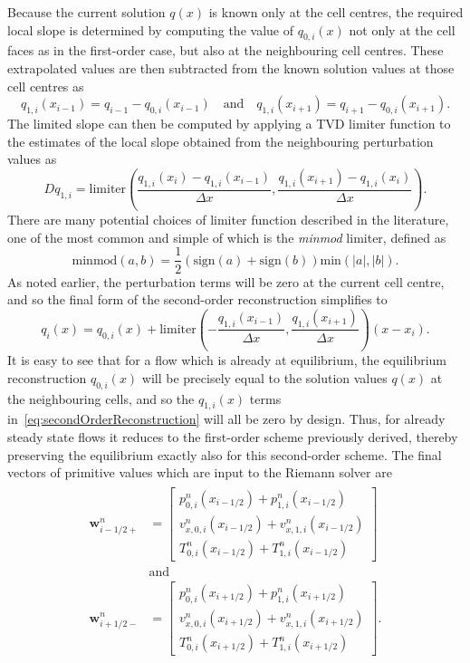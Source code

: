 Because the current solution $q(x)$ is known only at the cell centres, the required local slope is determined by computing the value of $q_{0,i}(x)$ not only at the cell faces as in the first-order case, but also at the neighbouring cell centres. These extrapolated values are then subtracted from the known solution values at those cell centres as
\begin{equation}
q_{1,i}(x_{i-1})=q_{i-1}-q_{0,i}(x_{i-1})\quad \textrm{and}\quad q_{1,i}(x_{i+1})=q_{i+1}-q_{0,i}(x_{i+1}).
\end{equation}
The limited slope can then be computed by applying a TVD limiter function to the estimates of the local slope obtained from the neighbouring perturbation values as
\begin{equation}
Dq_{1,i}=\textrm{limiter}\left(\frac{q_{1,i}(x_i)-q_{1,i}(x_{i-1})}{\Delta x},\frac{q_{1,i}(x_{i+1})-q_{1,i}(x_i)}{\Delta x}\right).
\end{equation}
There are many potential choices of limiter function described in the literature, one of the most common and simple of which is the \emph{minmod} limiter, defined as
\begin{equation} \label{eq:minmod}
\textrm{minmod}(a,b)=\frac{1}{2}\left(\textrm{sign}(a)+\textrm{sign}(b)\right)\textrm{min}\left(|a|,|b|\right).
\end{equation}
As noted earlier, the perturbation terms will be zero at the current cell centre, and so the final form of the second-order reconstruction simplifies to
\begin{equation} \label{eq:secondOrderReconstruction}
q_i(x)=q_{0,i}(x)+\textrm{limiter}\left(-\frac{q_{1,i}(x_{i-1})}{\Delta x},\frac{q_{1,i}(x_{i+1})}{\Delta x}\right)(x-x_i).
\end{equation}
It is easy to see that for a flow which is already at equilibrium, the equilibrium reconstruction $q_{0,i}(x)$ will be precisely equal to the solution values $q(x)$ at the neighbouring cells, and so the $q_{1,i}(x)$ terms in~\eqref{eq:secondOrderReconstruction} will all be zero by design. Thus, for already steady state flows it reduces to the first-order scheme previously derived, thereby preserving the equilibrium exactly also for this second-order scheme. The final vectors of primitive values which are input to the Riemann solver are
\begin{align} \label{eq:primitives1D2}
\begin{split}
\mathbf{w}_{i-1/2+}^n&=
\begin{bmatrix}
p_{0,i}^n(x_{i-1/2})+p_{1,i}^n(x_{i-1/2}) \\ v_{x,0,i}^n(x_{i-1/2})+v_{x,1,i}^n(x_{i-1/2}) \\ T_{0,i}^n(x_{i-1/2})+T_{1,i}^n(x_{i-1/2})
\end{bmatrix} \\
&\textrm{and} \\
\mathbf{w}_{i+1/2-}^n&=
\begin{bmatrix}
p_{0,i}^n(x_{i+1/2})+p_{1,i}^n(x_{i+1/2}) \\ v_{x,0,i}^n(x_{i+1/2})+ v_{x,1,i}^n(x_{i+1/2}) \\ T_{0,i}^n(x_{i+1/2})+T_{1,i}^n(x_{i+1/2})
\end{bmatrix}.
\end{split}
\end{align}
